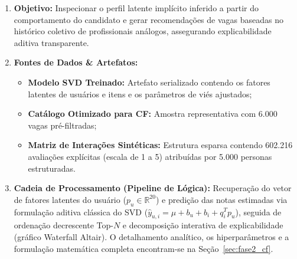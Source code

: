 \begin{enumerate}[label=\textbf{\arabic*.}]
    \item \textbf{Objetivo:} Inspecionar o perfil latente implícito inferido a partir do comportamento do candidato e gerar recomendações de vagas baseadas no histórico coletivo de profissionais análogos, assegurando explicabilidade aditiva transparente.
    \item \textbf{Fontes de Dados \& Artefatos:}
    \begin{itemize}
        \item \textbf{Modelo SVD Treinado:} Artefato serializado contendo os fatores latentes de usuários e itens e os parâmetros de viés ajustados;
        \item \textbf{Catálogo Otimizado para CF:} Amostra representativa com 6.000 vagas pré-filtradas;
        \item \textbf{Matriz de Interações Sintéticas:} Estrutura esparsa contendo 602.216 avaliações explícitas (escala de 1 a 5) atribuídas por 5.000 personas estruturadas.
    \end{itemize}
    \item \textbf{Cadeia de Processamento (Pipeline de Lógica):}
    Recuperação do vetor de fatores latentes do usuário ($p_u \in \mathbb{R}^{20}$) e predição das notas estimadas via formulação aditiva clássica do SVD ($\hat{y}_{u,i} = \mu + b_u + b_i + q_i^T p_u$), seguida de ordenação decrescente Top-$N$ e decomposição interativa de explicabilidade (gráfico Waterfall Altair). O detalhamento analítico, os hiperparâmetros e a formulação matemática completa encontram-se na Seção~\ref{sec:fase2_cf}.
\end{enumerate}

